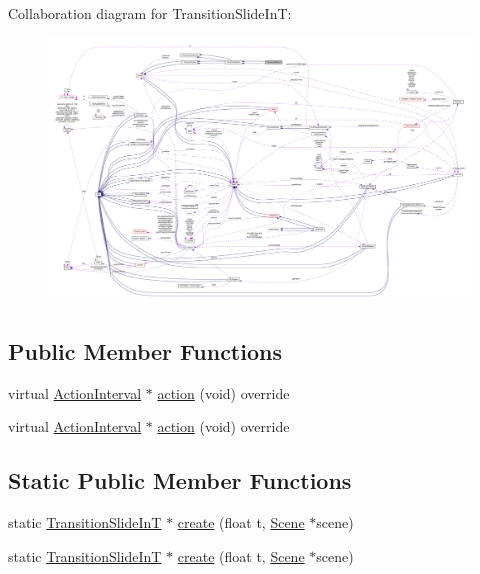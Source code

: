 Collaboration diagram for Transition\+Slide\+InT\+:
\nopagebreak
\begin{figure}[H]
\begin{center}
\leavevmode
\includegraphics[width=350pt]{classTransitionSlideInT__coll__graph}
\end{center}
\end{figure}
\subsection*{Public Member Functions}
\begin{DoxyCompactItemize}
\item 
virtual \hyperlink{classActionInterval}{Action\+Interval} $\ast$ \hyperlink{classTransitionSlideInT_a014b428d93b31e8ef5075865a5de9c63}{action} (void) override
\item 
virtual \hyperlink{classActionInterval}{Action\+Interval} $\ast$ \hyperlink{classTransitionSlideInT_a47099107f7fdb8ca5f5f16f66a5c6670}{action} (void) override
\end{DoxyCompactItemize}
\subsection*{Static Public Member Functions}
\begin{DoxyCompactItemize}
\item 
static \hyperlink{classTransitionSlideInT}{Transition\+Slide\+InT} $\ast$ \hyperlink{classTransitionSlideInT_a1ef0e6155f58e017caa700f4ce613010}{create} (float t, \hyperlink{classScene}{Scene} $\ast$scene)
\item 
static \hyperlink{classTransitionSlideInT}{Transition\+Slide\+InT} $\ast$ \hyperlink{classTransitionSlideInT_a125bf4799c4b4c8cb5fb4c4da9b56461}{create} (float t, \hyperlink{classScene}{Scene} $\ast$scene)
\end{DoxyCompactItemize}
